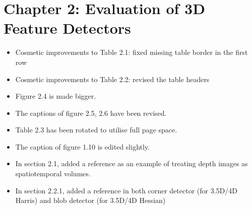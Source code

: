 \documentclass[10pt, a4paper]{article}
\begin{document}
\section{Chapter 2: Evaluation of 3D Feature Detectors}

\begin{itemize}
\item Cosmetic improvements to Table 2.1: fixed missing table border in the first row
\item Cosmetic improvements to Table 2.2: revised the table headers
\item Figure 2.4 is made bigger.
\item The captions of figure 2.5, 2.6 have been revised.
\item Table 2.3 has been rotated to utilise full page space. 
\item The caption of figure 1.10 is edited slightly.
\item In section 2.1, added a reference \cite{Hadfield2013} as an example of treating depth images as spatiotemporal volumes.
\item In section 2.2.1, added a reference \cite{Hadfield2013} in both corner detector (for 3.5D/4D Harris) and blob detector (for 3.5D/4D Hessian)
\end{itemize}
\end{document}
